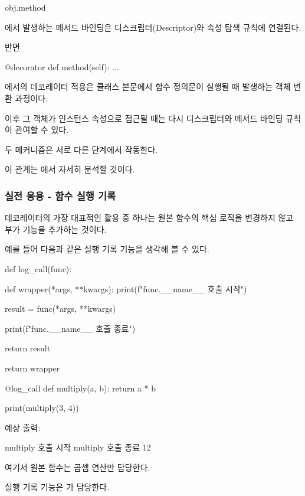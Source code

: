 \begin{dhkcode}
obj.method
\end{dhkcode}

에서 발생하는 메서드 바인딩은 디스크립터(Descriptor)와 속성 탐색 규칙에 연결된다.

반면

\begin{dhkcode}
@decorator
def method(self):
    ...
\end{dhkcode}

에서의 데코레이터 적용은 클래스 본문에서 함수 정의문이 실행될 때 발생하는 객체 변환 과정이다.

이후 그 객체가 인스턴스 속성으로 접근될 때는 다시 디스크립터와 메서드 바인딩 규칙이 관여할 수 있다.

두 메커니즘은 서로 다른 단계에서 작동한다.

이 관계는 에서 자세히 분석할 것이다.

\subsubsection{실전 응용 - 함수 실행 기록}

데코레이터의 가장 대표적인 활용 중 하나는 원본 함수의 핵심 로직을 변경하지 않고 부가 기능을 추가하는 것이다.

예를 들어 다음과 같은 실행 기록 기능을 생각해 볼 수 있다.

\begin{dhkcode}
def log_call(func):

    def wrapper(*args, **kwargs):
        print(f"{func.__name__} 호출 시작")

        result = func(*args, **kwargs)

        print(f"{func.__name__} 호출 종료")

        return result

    return wrapper


@log_call
def multiply(a, b):
    return a * b


print(multiply(3, 4))
\end{dhkcode}

예상 출력:

\begin{dhkzsh}
multiply 호출 시작
multiply 호출 종료
12
\end{dhkzsh}

여기서 원본  함수는 곱셈 연산만 담당한다.

실행 기록 기능은 가 담당한다.

